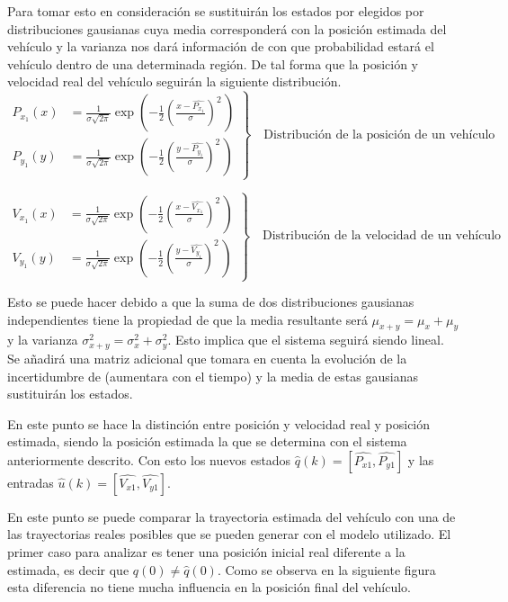 \par
Para tomar esto en consideración se sustituirán los estados por elegidos por distribuciones gausianas cuya media corresponderá con la posición estimada del vehículo y la varianza nos dará información de con que probabilidad estará el vehículo dentro de una determinada región. De tal forma que la posición y velocidad real del vehículo seguirán la siguiente distribución. 
\begin{equation*}
\left.
 \begin{aligned}
P_{x_1}(x) & = \frac{1}{\sigma\sqrt{2\pi}} 
  \exp\left( -\frac{1}{2}\left(\frac{x-\hat{P_{x_1}}}{\sigma}\right)^{\!2}\,\right) \\
P_{y_1}(y) & = \frac{1}{\sigma\sqrt{2\pi}} 
  \exp\left( -\frac{1}{2}\left(\frac{y-\hat{P_{y_1}}}{\sigma}\right)^{\!2}\,\right)
\end{aligned}
\right\}
\quad\text{Distribución de la posición de un vehículo}
\end{equation*}

\begin{equation*}
\left.
 \begin{aligned}
V_{x_1}(x) & = \frac{1}{\sigma\sqrt{2\pi}} 
  \exp\left( -\frac{1}{2}\left(\frac{x-\hat{V_{x_1}}}{\sigma}\right)^{\!2}\,\right) \\
V_{y_1}(y) & = \frac{1}{\sigma\sqrt{2\pi}} 
  \exp\left( -\frac{1}{2}\left(\frac{y-\hat{V_{y_1}}}{\sigma}\right)^{\!2}\,\right)
\end{aligned}
\right\}
\quad\text{Distribución de la velocidad de un vehículo}
\end{equation*}

\par
Esto se puede hacer debido a que la suma de dos distribuciones gausianas independientes tiene la propiedad de que la media resultante será $\mu_{x+y}=\mu_{x}+\mu_{y}$ y la varianza $\sigma_{x+y}^2=\sigma_{x}^2+ \sigma_{y}^2$. Esto implica que el sistema seguirá siendo lineal. Se añadirá una matriz adicional que tomara en cuenta la evolución de la incertidumbre de (aumentara con el tiempo) y la media de estas gausianas sustituirán los estados. 
\par
En este punto se hace la distinción entre posición y velocidad real y posición estimada, siendo la posición estimada la que se determina con el sistema anteriormente descrito. Con esto los nuevos estados $\hat{q}(k)=[\hat{P_{x1}},\hat{P_{y1}}]$ y las entradas $\hat{u}(k)=[\hat{V_{x1}},\hat{V_{y1}}]$.
\par
En este punto se puede comparar la trayectoria estimada del vehículo con una de las trayectorias reales posibles que se pueden generar con el modelo utilizado. El primer caso para analizar es tener una posición inicial real diferente a la estimada, es decir que $q(0)\neq\hat{q}(0)$. Como se observa en la siguiente figura esta diferencia no tiene mucha influencia en la posición final del vehículo.  
\par

